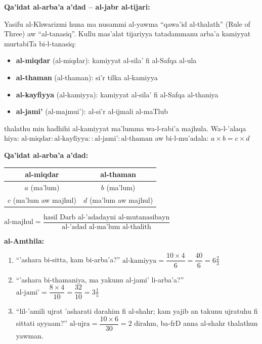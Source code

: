 \documentclass[11pt,a4paper]{book}
\begin{document}
\begin{commentary}
\textbf{Qa'idat al-arba'a a'dad -- al-jabr al-tijari:}

Yasifu al-Khwarizmi huna ma nusammi al-yawma ``qawa'id al-thalath''
(Rule of Three) aw ``al-tanasiq''. Kullu mas'alat tijariyya tatadammanu
arba'a kamiyyat murtabiTa bi-l-tanasiq:

\begin{itemize}
  \item \textbf{al-miqdar} (al-miqdar): kamiyyat al-sila' fi al-Safqa al-ula
  \item \textbf{al-thaman} (al-thaman): si'r tilka al-kamiyya
  \item \textbf{al-kayfiyya} (al-kamiyya): kamiyyat al-sila' fi al-Safqa al-thaniya
  \item \textbf{al-jami'} (al-majmui'): al-si'r al-ijmali al-maTlub
\end{itemize}

thalathu min hadhihi al-kamiyyat ma'lumma wa-l-rabi'a majhula.
Wa-l-'alaqa hiya: $\text{al-miqdar} : \text{al-kayfiyya} :: \text{al-jami'} : \text{al-thaman}$
aw bi-l-mu'adala: $a \times b = c \times d$
\end{commentary}

\begin{mathexplain}
\textbf{Qa'idat al-arba'a a'dad:}

\begin{center}
\begin{tabular}{c|c}
\textbf{al-miqdar} & \textbf{al-thaman} \\
\hline
$a$ (ma'lum) & $b$ (ma'lum) \\
$c$ (ma'lum aw majhul) & $d$ (ma'lum aw majhul) \\
\end{tabular}

\vspace{0.3cm}

$\text{al-majhul} = \dfrac{\text{hasil Darb al-'adadayni al-mutanasibayn}}{\text{al-'adad al-ma'lum al-thalith}}$
\end{center}

\textbf{al-Amthila:}
\begin{enumerate}
  \item ``'ashara bi-sitta, kam bi-arba'a?''
  $\text{al-kamiyya} = \dfrac{10 \times 4}{6} = \dfrac{40}{6} = 6\tfrac{2}{3}$

  \item ``'ashara bi-thamaniya, ma yakunu al-jami' li-arba'a?''
  $\text{al-jami'} = \dfrac{8 \times 4}{10} = \dfrac{32}{10} = 3\tfrac{1}{5}$

  \item ``lil-'amili ujrat 'asharati darahim fi al-shahr; kam
    yajib an takunu ujratuhu fi sittati ayyaam?''
  $\text{al-ujra} = \dfrac{10 \times 6}{30} = 2 \text{ dirahm}$,
  ba-frD anna al-shahr thalathun yawman.
\end{enumerate}
\end{mathexplain}
\end{document}
